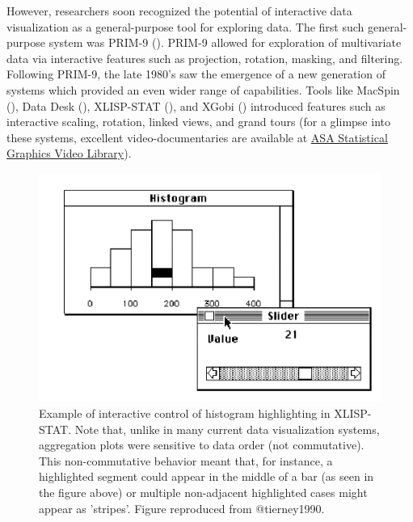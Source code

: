 \documentclass[
]{book}
\begin{document}
However, researchers soon recognized the potential of interactive data visualization as a general-purpose tool for exploring data. The first such general-purpose system was PRIM-9 (). PRIM-9 allowed for exploration of multivariate data via interactive features such as projection, rotation, masking, and filtering. Following PRIM-9, the late 1980's saw the emergence of a new generation of systems which provided an even wider range of capabilities. Tools like MacSpin (), Data Desk (), XLISP-STAT (), and XGobi () introduced features such as interactive scaling, rotation, linked views, and grand tours (for a glimpse into these systems, excellent video-documentaries are available at \href{https://community.amstat.org/jointscsg-section/media/videos}{ASA Statistical Graphics Video Library}).

\begin{figure}

{\centering \includegraphics[width=13.29in]{./figures/xlisp-stat} 

}

\caption{Example of interactive control of histogram highlighting in XLISP-STAT. Note that, unlike in many current data visualization systems, aggregation plots were sensitive to data order (not commutative). This non-commutative behavior meant that, for instance, a highlighted segment could appear in the middle of a bar (as seen in the figure above) or multiple non-adjacent highlighted cases might appear as 'stripes'. Figure reproduced from @tierney1990.}\label{fig:xlisp-stat}
\end{figure}
\end{document}

